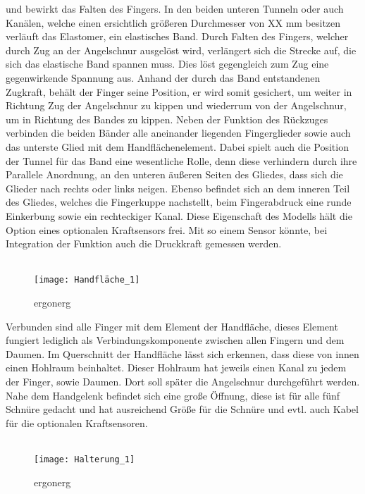 \documentclass[titlepage,12pt,twoside]{article}
\begin{document}
und bewirkt das Falten des Fingers. In den beiden unteren Tunneln oder auch Kanälen, 
welche einen ersichtlich größeren Durchmesser von XX mm besitzen verläuft das 
Elastomer, ein elastisches Band. Durch Falten des Fingers, welcher durch Zug an der 
Angelschnur ausgelöst wird, verlängert sich die Strecke auf, die sich das elastische 
Band spannen muss. Dies löst gegengleich zum Zug eine gegenwirkende Spannung aus. 
Anhand der durch das Band entstandenen Zugkraft, behält der Finger seine Position, 
er wird somit gesichert, um weiter in Richtung Zug der Angelschnur zu kippen und 
wiederrum von der Angelschnur, um in Richtung des Bandes zu kippen. Neben der 
Funktion des Rückzuges verbinden die beiden Bänder alle aneinander liegenden 
Fingerglieder sowie auch das unterste Glied mit dem Handflächenelement. Dabei 
spielt auch die Position der Tunnel für das Band eine wesentliche Rolle, denn 
diese verhindern durch ihre Parallele Anordnung, an den unteren äußeren Seiten 
des Gliedes, dass sich die Glieder nach rechts oder links neigen. 
Ebenso befindet sich an dem inneren Teil des Gliedes, welches die Fingerkuppe 
nachstellt, beim Fingerabdruck eine runde Einkerbung sowie ein rechteckiger Kanal. 
Diese Eigenschaft des Modells hält die Option eines optionalen Kraftsensors frei. 
Mit so einem Sensor könnte, bei Integration der Funktion auch die Druckkraft 
gemessen werden. \\
\\
\begin{figure}[H]
	\begin{center}
		\scalebox{1}
		{\texttt{[image: Handfläche\_1]}}
		\caption{ergonerg}
		\label{fig:Handfläche_1}		
	\end{center}
\end{figure}
\hfill \break
Verbunden sind alle Finger mit dem Element der Handfläche, dieses Element fungiert 
lediglich als Verbindungskomponente zwischen allen Fingern und dem Daumen. 
Im Querschnitt der Handfläche lässt sich erkennen, dass diese von innen einen 
Hohlraum beinhaltet. Dieser Hohlraum hat jeweils einen Kanal zu jedem der Finger, 
sowie Daumen. Dort soll später die Angelschnur durchgeführt werden. Nahe dem 
Handgelenk befindet sich eine große Öffnung, diese ist für alle fünf Schnüre 
gedacht und hat ausreichend Größe für die Schnüre und evtl. auch Kabel für die 
optionalen Kraftsensoren. \\
\\
\begin{figure}[H]
	\begin{center}
		\scalebox{1}
		{\texttt{[image: Halterung\_1]}}
		\caption{ergonerg}
		\label{fig:Halterung_1}		
	\end{center}
\end{figure}
\end{document}
